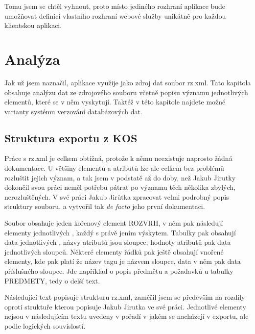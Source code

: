 \documentclass[11pt,twoside,a4paper]{book}
\begin{document}
Tomu jsem se chtěl vyhnout, proto místo jediného rozhraní aplikace bude umožňovat definici vlastního rozhraní webové služby unikátně pro každou klientskou aplikaci.


\chapter{Analýza}

Jak už jsem naznačil, aplikace využije jako zdroj dat soubor rz.xml. Tato kapitola obsahuje analýzu dat ze zdrojového souboru včetně popisu významu jednotlivých elementů, které se v něm vyskytují. Taktéž v této kapitole najdete možné varianty systému verzování databázových dat.

\section{Struktura exportu z KOS}
Práce s rz.xml je celkem obtížná, protože k němu neexistuje naprosto žádná dokumentace. U většiny elementů a atributů lze ale celkem bez problémů rozluštit jejich význam, a tak jsem v podstatě až do doby, než Jakub Jirutky\cite{jirutka} dokončil svou práci neměl potřebu pátrat po významu těch několika zbylých, nerozluštěných. V své práci Jakub Jirůtka zpracovat velmi podrobný popis struktury souboru, a vytvořil tak \textit{de facto} jeho první dokumentaci. 

Soubor obsahuje jeden kořenový element ROZVRH, v něm pak následují elementy jednotlivých , každý s právě jením výskytem. Tabulky pak obsahují data jednotlivých , názvy atributů jsou sloupce, hodnoty atributů pak data jednotlivých sloupců. Některé elementy řádků pak ještě obsahují vnořené elementy, kde pak platí že název tagu je názvem sloupce, data v něm pak data příslušného sloupce. Jde například o popis předmětu a požadavků u tabulky PREDMETY, tedy o delší text.

Následující text popisuje strukturu rz.xml, zaměřil jsem se především na rozdíly oproti struktuře kterou popisuje Jakub Jirutka ve své práci\cite{jirutka}. Jednotlivé elementy nejsou v následujícím textu uvedeny v pořadí v jakém se nacházejí v exportu, ale podle logických souvislostí.
\end{document}
